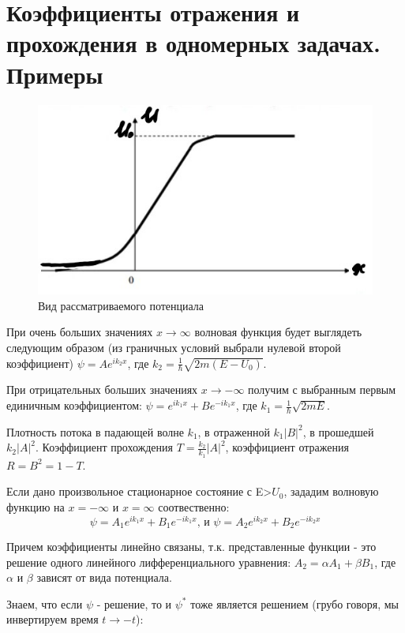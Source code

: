 \newpage
\chapter{Коэффициенты отражения и прохождения в одномерных задачах. Примеры}

\par 
\begin{figure} 
\vspace{-2ex}
\includegraphics[width=1\linewidth]{pictures/21.1.jpg}
\caption{Вид рассматриваемого потенциала}
\end{figure}
\par При очень больших значениях $x\rightarrow \infty$ волновая функция будет выглядеть следующим образом (из граничных условий выбрали нулевой второй коэффициент) $\psi = A e^{ik_2x}$, где $k_2=\frac{1}{\hbar}\sqrt{2m(E-U_0)}$.
\par При отрицательных больших значениях $x\rightarrow -\infty$ получим с выбранным первым единичным коэффициентом: $\psi = e^{ik_1x} +B e^{-ik_1x} $, где $k_1 = \frac{1}{\hbar} \sqrt{2mE}$.
\par Плотность потока в падающей волне $k_1$, в отраженной $k_1|B|^2$, в прошедшей $k_2|A|^2$. Коэффициент прохождения $T=\frac{k_2}{k_1}|A|^2$, коэффициент отражения $R=B^2=1-T$.
\par Если дано произвольное стационарное состояние с E>$U_0$, зададим волновую функцию на $x=-\infty$ и $x=\infty$ соотвественно:
$$\psi=A_1 e^{ik_1x}+B_1 e^{-ik_1x} \text{, и }\psi=A_2 e^{ik_2x}+B_2 e^{-ik_2x}$$
\par Причем коэффициенты линейно связаны, т.к. представленные функции - это решение одного линейного лифференциального уравнения: $A_2=\alpha A_1+\beta B_1 $, где $\alpha $ и $\beta$ зависят от вида потенциала.
\par Знаем, что если $\psi$ - решение, то и $\psi^*$ тоже является решением (грубо говоря, мы инвертируем время $ t \rightarrow - t$):
